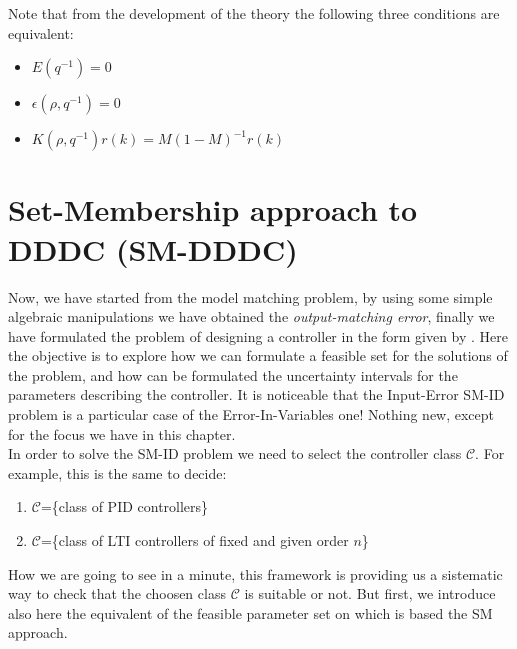 \begin{remark}
    Note that from the development of the theory the following three conditions are equivalent:
    \begin{itemize}
        \itemsep-0.3em
        \item $E(q^{-1})=0$
        \item $\epsilon(\rho,q^{-1})=0$
        \item $K(\rho,q^{-1})r(k)=M (1-M)^{-1} r(k)$
    \end{itemize}
\end{remark}

\section{Set-Membership approach to DDDC (SM-DDDC)}
Now, we have started from the model matching problem, by using some simple algebraic manipulations we have obtained the \textit{output-matching error}, finally we have formulated the problem of designing a controller in the form given by . Here the objective is to explore how we can formulate a feasible set for the solutions of the problem, and how can be formulated the uncertainty intervals for the parameters describing the controller. It is noticeable that the Input-Error SM-ID problem is a particular case of the Error-In-Variables one! Nothing new, except for the focus we have in this chapter.\\

\noindent
In order to solve the SM-ID problem we need to select the controller class $\mathcal{C}$. For example, this is the same to decide: 
\begin{enumerate}
    \itemsep-0.3em
    \item $\mathcal{C}$=\{class of PID controllers\}
    \item $\mathcal{C}$=\{class of LTI controllers  of fixed and given order $n$\}
\end{enumerate}

How we are going to see in a minute, this framework is providing us a sistematic way to check that the choosen class $\mathcal{C}$ is suitable or not. But first, we introduce also here the equivalent of the feasible parameter set on which is based the SM approach.

